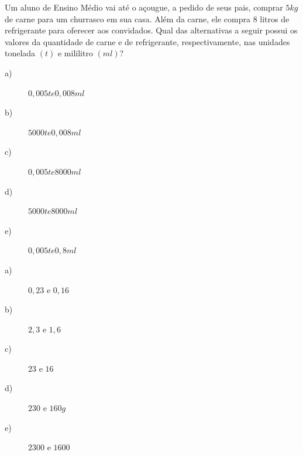 \begin{exercise}[ENEM 2011]
Um aluno de Ensino Médio vai até o açougue, a pedido de seus pais, comprar $5 kg$ de carne para um churrasco em sua casa. Além da carne, ele compra $8$ litros de refrigerante para oferecer aos convidados. Qual das alternativas a seguir possui os valores da quantidade de carne e de refrigerante, respectivamente, nas unidades tonelada $(t)$ e mililitro $(ml)$?

    \begin{description}
        \item[a)] $0,005 t e 0,008 ml$
        \item[b)] $5000 t e 0,008 ml$
        \item[c)] $0,005 t e 8000 ml$
        \item[d)] $5000 t e 8000 ml$
        \item[e)] $0,005 t e 0,8 ml$
    \end{description}

\end{exercise}
\begin{exercise}[ENEM 2011]


    \begin{description}
        \item[a)] $0,23 \textrm{ e } 0,16$
        \item[b)] $2,3 \textrm{ e } 1,6$
        \item[c)] $23 \textrm{ e } 16$
        \item[d)] $230 \textrm{ e } 160g$
        \item[e)] $2300 \textrm{ e } 1600$
    \end{description}

\end{exercise}